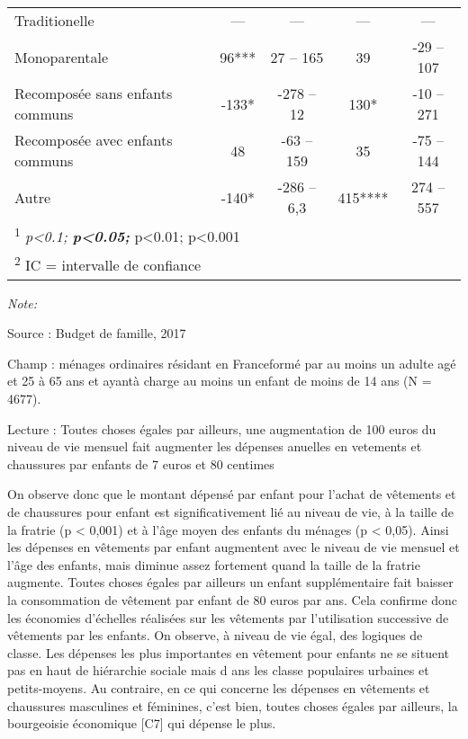 \documentclass[
  12pt,
]{book}
\begin{document}
\begin{table}[!h]
{\begin{threeparttable}
\begin{tabular}[t]{lcccc}
\hspace{1em}Traditionelle & — & — & — & —\\
\hspace{1em}Monoparentale & 96*** & 27 – 165 & 39 & -29 – 107\\
\addlinespace
\hspace{1em}Recomposée sans enfants communs & -133* & -278 – 12 & 130* & -10 – 271\\
\hspace{1em}Recomposée avec enfants communs & 48 & -63 – 159 & 35 & -75 – 144\\
\hspace{1em}Autre & -140* & -286 – 6,3 & 415**** & 274 – 557\\
\bottomrule
\multicolumn{5}{l}{\rule{0pt}{1em}\textsuperscript{1} \textit{p<0.1; \textbf{p<0.05; }}p<0.01; \textbf{}p<0.001}\\
\multicolumn{5}{l}{\rule{0pt}{1em}\textsuperscript{2} IC = intervalle de confiance}\\
\end{tabular}
\begin{tablenotes}
\item \textit{Note: } 
\item Source : Budget de famille, 2017
\item Champ : ménages ordinaires résidant en Franceformé par au moins un adulte agé et 25 à 65 ans et ayantà charge au moins un enfant de moins de 14 ans (N = 4677).
\item Lecture : Toutes choses égales par ailleurs, une augmentation de 100 euros du niveau de vie mensuel fait augmenter les dépenses anuelles en vetements et chaussures par enfants de 7 euros et 80 centimes
\end{tablenotes}
\end{threeparttable}}
\end{table}

On observe donc que le montant dépensé par enfant pour l'achat de
vêtements et de chaussures pour enfant est significativement lié au
niveau de vie, à la taille de la fratrie (p \textless{} 0,001) et à
l'âge moyen des enfants du ménages (p \textless{} 0,05). Ainsi les
dépenses en vêtements par enfant augmentent avec le niveau de vie
mensuel et l'âge des enfants, mais diminue assez fortement quand la
taille de la fratrie augmente. Toutes choses égales par ailleurs un
enfant supplémentaire fait baisser la consommation de vêtement par
enfant de 80 euros par ans. Cela confirme donc les économies d'échelles
réalisées sur les vêtements par l'utilisation successive de vêtements
par les enfants. On observe, à niveau de vie égal, des logiques de
classe. Les dépenses les plus importantes en vêtement pour enfants ne se
situent pas en haut de hiérarchie sociale mais d ans les classe
populaires urbaines et petits-moyens. Au contraire, en ce qui concerne
les dépenses en vêtements et chaussures masculines et féminines, c'est
bien, toutes choses égales par ailleurs, la bourgeoisie économique
{[}C7{]} qui dépense le plus.
\end{document}
